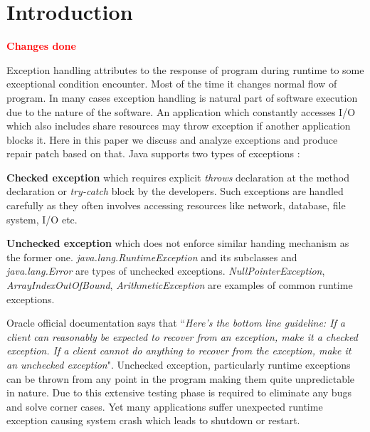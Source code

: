 \section{Introduction}
\label{sec:intro}

\textcolor{red}{\textbf{Changes done}}\newline

Exception handling attributes to the response of program during runtime to some
exceptional condition encounter.
Most of the time it changes normal flow of program. In many cases exception
handling is natural part of software execution due to the nature of the
software.
An application which constantly accesses I/O which also includes share resources
may throw exception if another application blocks it.
Here in this paper we discuss and analyze \java exceptions and produce repair
patch based on that. Java supports two types of exceptions :
\begin{mylist}
	
\item \textbf{Checked exception} which requires explicit \emph{throws}
declaration at the method declaration or \emph{try-catch} block by the
developers. Such exceptions are handled carefully as they often involves
accessing resources like network, database, file system, I/O etc.
	
\item \textbf{Unchecked exception} which does not enforce similar handing
mechanism as the former one. \emph{java.lang.RuntimeException} and its
subclasses and \emph{java.lang.Error} are types of unchecked exceptions.
\emph{NullPointerException}, \emph{ArrayIndexOutOfBound},
\emph{ArithmeticException} are examples of common \java runtime exceptions.

\end{mylist}

Oracle official documentation says that ``\emph{Here's the bottom line
guideline: If a client can reasonably be expected to recover from an exception,
 make it a checked exception. If a client cannot do anything to recover from the
 exception, make it an unchecked exception}".
 Unchecked exception, particularly runtime exceptions can be thrown from any
 point in the program making them quite unpredictable in nature.
 Due to this extensive testing phase is required to eliminate any bugs and solve
 corner cases.
 Yet many applications suffer unexpected runtime exception causing system crash
 which leads to shutdown or restart.

